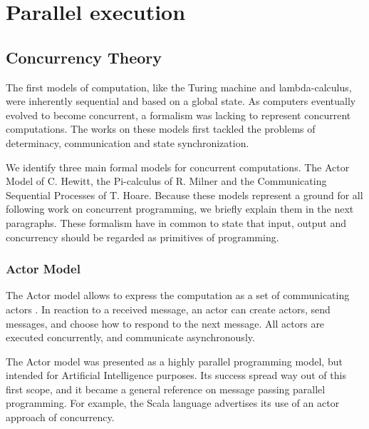 \section{Parallel execution}


\subsection{Concurrency Theory}

The first models of computation, like the Turing machine and lambda-calculus, were inherently sequential and based on a global state.
As computers eventually evolved to become concurrent, a formalism was lacking  to represent concurrent computations.
The works on these models first tackled the problems of determinacy, communication and state synchronization.

We identify three main formal models for concurrent computations.
The Actor Model of C. Hewitt, the Pi-calculus of R. Milner and the Communicating Sequential Processes of T. Hoare.
Because these models represent a ground for all following work on concurrent programming, we briefly explain them in the next paragraphs.
These formalism have in common to state that input, output and concurrency should be regarded as primitives of programming.


\subsubsection{Actor Model}


The Actor model allows to express the computation as a set of communicating actors \cite{Hewitt1973a, Hewitt1977, Clinger1981}.
In reaction to a received message, an actor can create actors, send messages, and choose how to respond to the next message.
All actors are executed concurrently, and communicate asynchronously.

The Actor model was presented as a highly parallel programming model, but intended for Artificial Intelligence purposes.
Its success spread way out of this first scope, and it became a general reference on message passing parallel programming.
For example, the Scala language advertises its use of an actor approach of concurrency.


